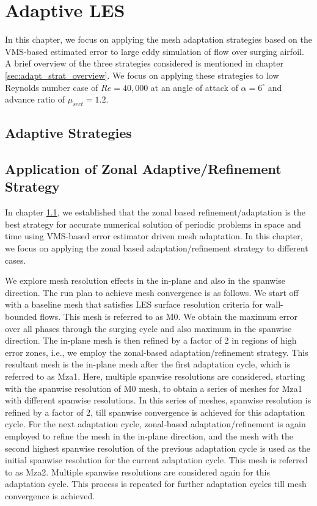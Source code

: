 \chapter{Adaptive LES}

In this chapter, we focus on applying the mesh adaptation strategies based on the VMS-based estimated error to large eddy simulation of flow over surging airfoil. A brief overview of the three strategies considered is mentioned in chapter \ref{sec:adapt_strat_overview}. We focus on applying these strategies to low Reynolds number case of $Re = 40, 000$ at an angle of attack of $\alpha = 6^\circ$ and advance ratio of $\mu_{sect} = 1.2$.

\section{Adaptive Strategies}

\label{sec:adaptive_strategy_comparison}


\section{Application of Zonal Adaptive/Refinement Strategy}
In chapter \ref{sec:adaptive_strategy_comparison}, we established that the zonal based refinement/adaptation is the best strategy for accurate numerical solution of periodic problems in space and time using VMS-based error estimator driven mesh adaptation. In this chapter, we focus on applying the zonal based adaptation/refinement strategy to different cases.

We explore mesh resolution effects in the in-plane and also in the spanwise direction. 
The run plan to achieve mesh convergence is as follows. 
We start off with a baseline mesh that satisfies LES surface resolution criteria for wall-bounded flows. This mesh is referred to as M0.
We obtain the maximum error over all phases through the surging cycle and also maximum in the spanwise direction.
The in-plane mesh is then refined by a factor of 2 in regions of high error zones, i.e., we employ the zonal-based adaptation/refinement strategy.
This resultant mesh is the in-plane mesh after the first adaptation cycle, which is referred to as Mza1.
Here, multiple spanwise resolutions are considered, starting with the spanwise resolution of M0 mesh, to obtain a series of meshes for Mza1 with different spanwise resolutions.
In this series of meshes, spanwise resolution is refined by a factor of 2, till spanwise convergence is achieved for this adaptation cycle. 
For the next adaptation cycle, zonal-based adaptation/refinement is again employed to refine the mesh in the in-plane direction, and the mesh with the second highest spanwise resolution of the previous adaptation cycle is used as the initial spanwise resolution for the current adaptation cycle. 
This mesh is referred to as Mza2.
Multiple spanwise resolutions are considered again for this adaptation cycle.
This process is repeated for further adaptation cycles till mesh convergence is achieved.

